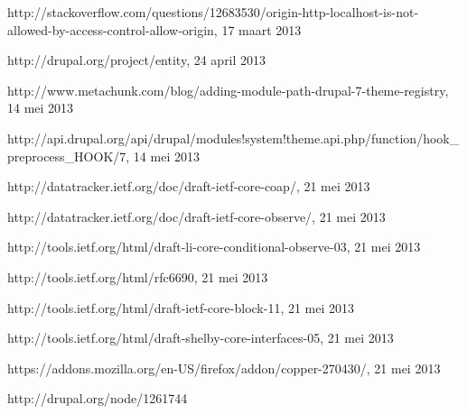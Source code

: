 \begin{thebibliography}{99}
 http://stackoverflow.com/questions/12683530/origin-http-localhost-is-not-allowed-by-access-control-allow-origin, 17 maart 2013

 http://drupal.org/project/entity, 24 april 2013

 http://www.metachunk.com/blog/adding-module-path-drupal-7-theme-registry, 14 mei 2013

 http://api.drupal.org/api/drupal/modules!system!theme.api.php/function/hook\_preprocess\_HOOK/7, 14 mei 2013

 http://datatracker.ietf.org/doc/draft-ietf-core-coap/, 21 mei 2013

 http://datatracker.ietf.org/doc/draft-ietf-core-observe/, 21 mei 2013

 http://tools.ietf.org/html/draft-li-core-conditional-observe-03, 21 mei 2013

 http://tools.ietf.org/html/rfc6690, 21 mei 2013

 http://tools.ietf.org/html/draft-ietf-core-block-11, 21 mei 2013

 http://tools.ietf.org/html/draft-shelby-core-interfaces-05, 21 mei 2013

 https://addons.mozilla.org/en-US/firefox/addon/copper-270430/, 21 mei 2013

 http://drupal.org/node/1261744

\end{thebibliography}

